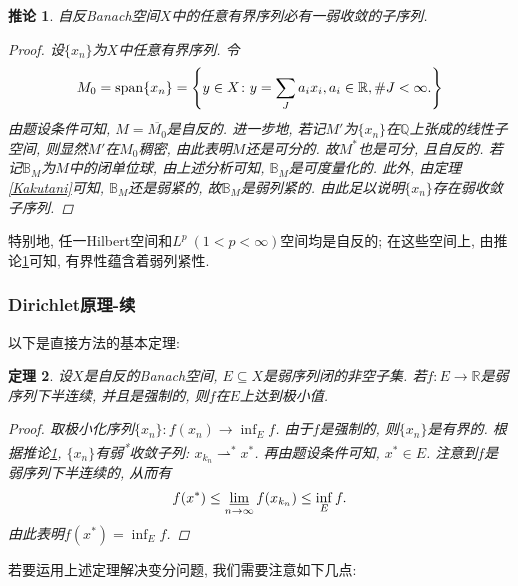 \documentclass[12pt,a4paper]{article}
\newtheorem{theorem}{定理}[section]
\newtheorem{corollary}[theorem]{推论}
\begin{document}
\begin{corollary}\label{coro2.9}
    自反Banach空间$X$中的任意有界序列必有一弱收敛的子序列.
    \begin{proof}
        设$\{x_n\}$为$X$中任意有界序列. 令
        \begin{equation*}
            M_0 = {\rm span} \{x_n\} = \left\{y \in X\colon y = \sum_Ja_ix_i, a_i \in \mathbb{R}, \# J < \infty.\right\}
        \end{equation*}
        由题设条件可知, $M = \overline{M_0}$是自反的. 进一步地, 若记$M'$为$\{x_n\}$在$\mathbb{Q}$上张成的线性子空间, 则显然$M'$在$M_0$稠密, 由此表明$M$还是可分的.
        故$M^*$也是可分, 且自反的. 若记$\mathbb{B}_M$为$M$中的闭单位球, 由上述分析可知, $\mathbb{B}_M$是可度量化的.
        此外, 由定理\ref{Kakutani}可知, $\mathbb{B}_M$还是弱紧的, 故$\mathbb{B}_M$是弱列紧的.
        由此足以说明$\{x_n\}$存在弱收敛子序列.
    \end{proof}
\end{corollary}

特别地, 任一Hilbert空间和$L^p \ (1 < p < \infty)$空间均是自反的; 在这些空间上, 由推论\ref{coro2.9}可知, 有界性蕴含着弱列紧性.

\subsubsection{Dirichlet原理-续}

以下是直接方法的基本定理: 

\begin{theorem}\label{th2.10}
    设$X$是自反的Banach空间, $E \subseteq X$是弱序列闭的非空子集.
    若$f \colon E \rightarrow \mathbb{R}$是弱序列下半连续, 并且是强制的, 则$f$在$E$上达到极小值.
    \begin{proof}
        取极小化序列$\{x_n\}\colon f(x_n) \rightarrow \inf_Ef$. 由于$f$是强制的, 则$\{x_n\}$是有界的.
        根据推论\ref{coro2.9}, $\{x_n\}$有弱\textsuperscript{*}收敛子列: $x_{k_n} \rightharpoonup^* x^*$. 再由题设条件可知, $x^* \in E$.
        注意到$f$是弱序列下半连续的, 从而有 
        \begin{equation*}
            f(x^*) \leq \varliminf\limits_{n \rightarrow \infty}f(x_{k_n}) \leq \inf_Ef.
        \end{equation*}
        由此表明$f(x^*) = \inf_Ef$.
    \end{proof}
\end{theorem}

若要运用上述定理解决变分问题, 我们需要注意如下几点:
\end{document}
